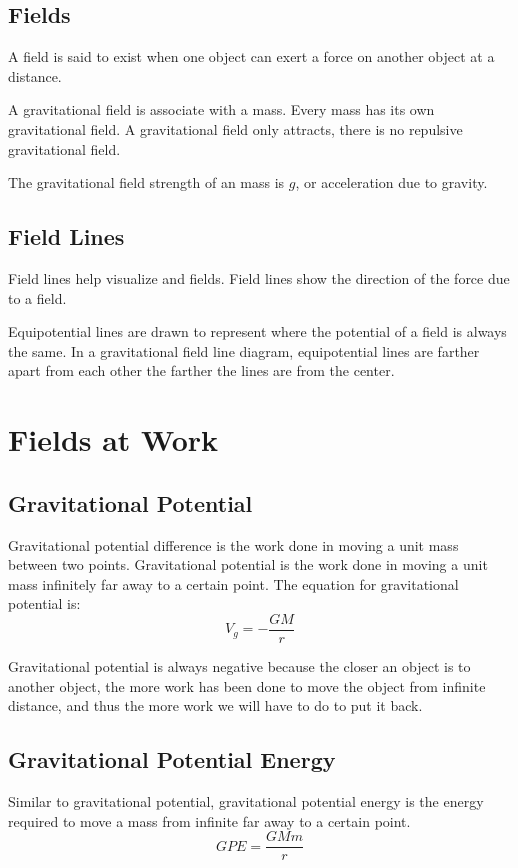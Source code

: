 \documentclass[../notes.tex]{subfiles}
\begin{document}
\subsection{Fields}
A field is said to exist when one object can exert a force on another object at a distance.

A gravitational field is associate with a mass.
Every mass has its own gravitational field.
A gravitational field only attracts, there is no repulsive gravitational field.

The gravitational field strength of an mass is $g$, or acceleration due to gravity.

\subsection{Field Lines}
Field lines help visualize and fields.
Field lines show the direction of the force due to a field.

Equipotential lines are drawn to represent where the potential of a field is always the same.
In a gravitational field line diagram, equipotential lines are farther apart from each other the farther the lines are from the center.

\section{Fields at Work}

\subsection{Gravitational Potential}
Gravitational potential difference is the work done in moving a unit mass between two points.
Gravitational potential is the work done in moving a unit mass infinitely far away to a certain point.
The equation for gravitational potential is:
\begin{equation}
	V_g = -\frac{GM}{r}
\end{equation}

Gravitational potential is always negative because the closer an object is to another object, the more work has been done to move the object from infinite distance, and thus the more work we will have to do to put it back.

\subsection{Gravitational Potential Energy}
Similar to gravitational potential, gravitational potential energy is the energy required to move a mass from infinite far away to a certain point.
\begin{equation}
	GPE = \frac{GMm}{r}
\end{equation}
\end{document}
